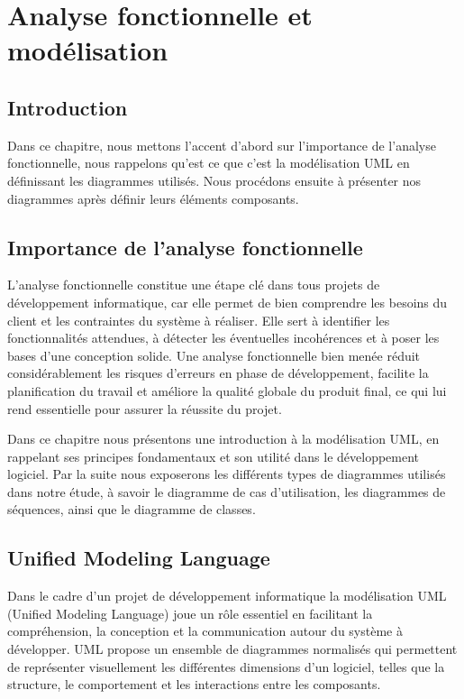 \documentclass[12pt,a4paper]{report}
\begin{document}
	\chapter{Analyse fonctionnelle et modélisation}
	
	\section{Introduction}
	
	Dans ce chapitre, nous mettons l'accent d'abord sur l'importance de l'analyse fonctionnelle, nous rappelons qu'est ce que c'est la modélisation UML en définissant les diagrammes utilisés. Nous procédons ensuite à présenter nos diagrammes après définir leurs éléments composants.
	
	\section{Importance de l'analyse fonctionnelle}
	
	L’analyse fonctionnelle constitue une étape clé dans tous projets de développement informatique, car elle permet de bien comprendre les besoins du client et les contraintes du système à réaliser. Elle sert à identifier les fonctionnalités attendues, à détecter les éventuelles incohérences et à poser les bases d’une conception solide. Une analyse fonctionnelle bien menée réduit considérablement les risques d’erreurs en phase de développement, facilite la planification du travail et améliore la qualité globale du produit final, ce qui lui rend essentielle pour assurer la réussite du projet.
	
	Dans ce chapitre nous présentons une introduction à la modélisation UML, en rappelant ses principes fondamentaux et son utilité dans le développement logiciel. Par la suite nous exposerons les différents types de diagrammes utilisés dans notre étude, à savoir le diagramme de cas d’utilisation, les diagrammes de séquences, ainsi que le diagramme de classes.
	
	\section{Unified Modeling Language}
	
	Dans le cadre d’un projet de développement informatique la modélisation UML (Unified Modeling Language) joue un rôle essentiel en facilitant la compréhension, la conception et la communication autour du système à développer. UML propose un ensemble de diagrammes normalisés qui permettent de représenter visuellement les différentes dimensions d’un logiciel, telles que la structure, le comportement et les interactions entre les composants.
	
\end{document}
